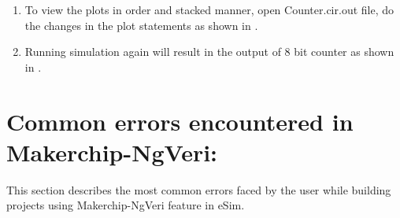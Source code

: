 \begin{enumerate}
\item To view the plots in order and stacked manner, open Counter.cir.out file, do the changes in the plot statements as shown in .

\item Running simulation again will result in the output of 8 bit counter as shown in . 

\end{enumerate}

\section {Common errors encountered in Makerchip-NgVeri:}

This section describes the most common errors faced by the user while building projects using Makerchip-NgVeri feature in eSim. 


